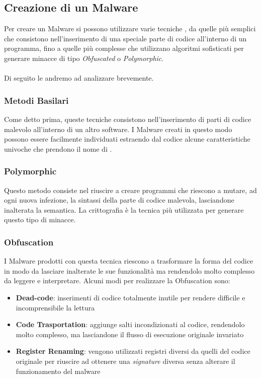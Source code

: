 \subsection{Creazione di un Malware}
Per creare un Malware si possono utilizzare varie tecniche \cite{malware}, da quelle più semplici che consistono nell'inserimento di una speciale parte di codice all'interno di un programma, fino a quelle più complesse che utilizzano algoritmi sofisticati per generare minacce di tipo \textit{Obfuscated} o \textit{Polymorphic}.\\
\\
Di seguito le andremo ad analizzare brevemente.

\subsubsection{Metodi Basilari}
Come detto prima, queste tecniche consistono nell'inserimento di parti di codice malevolo all'interno di un altro software. I Malware creati in questo modo possono essere facilmente individuati estraendo dal codice alcune caratteristiche univoche che prendono il nome di .\\

\subsubsection{Polymorphic}
Questo metodo consiste nel riuscire a creare programmi che riescono a mutare, ad ogni nuova infezione, la sintassi della parte di codice malevola, lasciandone inalterata la semantica. La crittografia è la tecnica più utilizzata per generare questo tipo di minacce.

\subsubsection{Obfuscation}
I Malware prodotti con questa tecnica riescono a trasformare la forma del codice in modo da lasciare inalterate le sue funzionalità ma rendendolo molto complesso da leggere e interpretare.
Alcuni modi per realizzare la Obfuscation sono: 

\begin{itemize}
    \item \textbf{Dead-code}: inserimenti di codice totalmente inutile per rendere difficile e incomprensibile la lettura
    
    \item \textbf{Code Trasportation}: aggiunge salti incondizionati al codice, rendendolo molto complesso, ma lasciandone il flusso di esecuzione originale invariato
    
    \item \textbf{Register Renaming}: vengono utilizzati registri diversi da quelli del codice originale per riuscire ad ottenere una \textit{signature} diversa senza alterare il funzionamento del malware
\end{itemize}